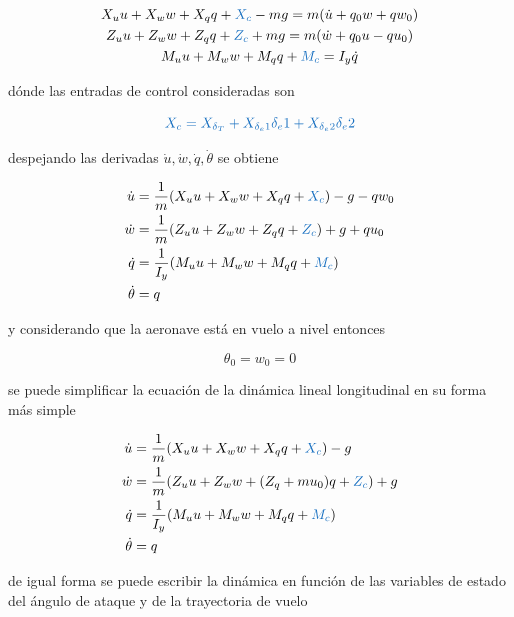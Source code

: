 \begin{gather}
    X_u u + X_w w + X_q q + \textcolor{RoyalBlue}{X_c} - mg = m(\dot u + q_0 w + q w_0) \\
    Z_u u + Z_w w + Z_q q + \textcolor{RoyalBlue}{Z_c} + mg = m ( \dot w + q_0 u - q u_0) \\
    M_u u + M_w w + M_q q + \textcolor{RoyalBlue}{M_c} = I_y \dot q
\end{gather}

dónde las entradas de control consideradas son

\begin{equation}
    \textcolor{RoyalBlue}{X_c = X_{\delta_{T}} + X_{\delta_e1} \delta_e1 + X_{\delta_e2} \delta_e2}
\end{equation}

despejando las derivadas $\dot{u}, \dot{w},\dot{q},\dot{\theta}$ se obtiene

\begin{align}
    \dot u &=\frac{1}{m}(X_u u + X_w w + X_q q + \textcolor{RoyalBlue}{X_c}) - g -q w_0  \\
    \dot w &= \frac{1}{m}(Z_u u + Z_w w + Z_q q + \textcolor{RoyalBlue}{Z_c}) + g + q u_0 \\
    \dot q &= \frac{1}{I_y}(M_u u + M_w w + M_q q + \textcolor{RoyalBlue}{M_c}) \\  
    \dot \theta &= q
\end{align}

y considerando que la aeronave está en vuelo a nivel entonces

\begin{equation}
    \theta_{0} = w_0 = 0
\end{equation}

se puede simplificar la ecuación de la dinámica lineal longitudinal en su forma más simple

\begin{align}
\label{lineal longitudinal cuerpo}
    \dot u &=\frac{1}{m}(X_u u + X_w w + X_q q + \textcolor{RoyalBlue}{X_c}) - g \\
    \dot w &= \frac{1}{m}(Z_u u + Z_w w + (Z_q + mu_0) q + \textcolor{RoyalBlue}{Z_c}) + g \\
    \dot q &= \frac{1}{I_y}(M_u u + M_w w + M_q q + \textcolor{RoyalBlue}{M_c}) \\  
    \dot \theta &= q
\label{lineal longitudinal cuerpo 1}
\end{align}

de igual forma se puede escribir la dinámica en función de las variables de estado del ángulo de ataque y de la trayectoria de vuelo


